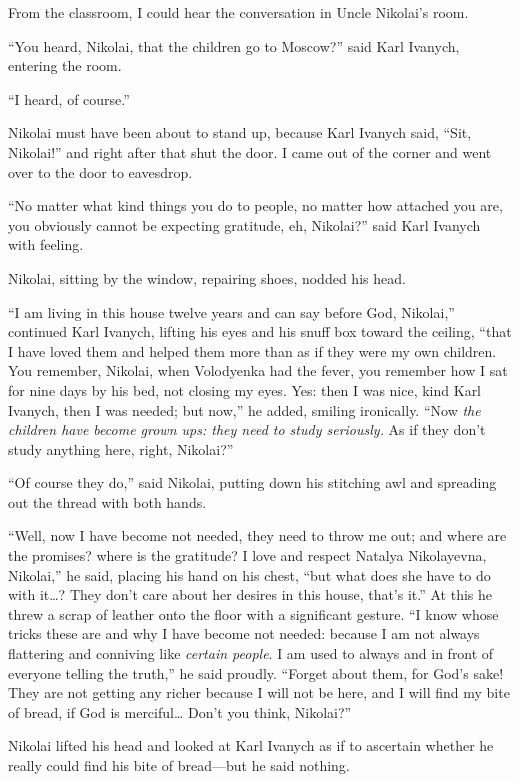 From the classroom, I could hear the conversation in Uncle Nikolai's room.

``You heard, Nikolai, that the children go to Moscow?'' said Karl Ivanych, entering the room. %

``I heard, of course.'' %

Nikolai must have been about to stand up, because Karl Ivanych said, ``Sit, Nikolai!'' and right after that shut the door. I came out of the corner and went over to the door to eavesdrop.

``No matter what kind things you do to people, no matter how attached you are, you obviously cannot be expecting gratitude, eh, Nikolai?'' said Karl Ivanych with feeling. %

Nikolai, sitting by the window, repairing shoes, nodded his head.

``I am living in this house twelve years and can say before God, Nikolai,'' continued Karl Ivanych, lifting his eyes and his snuff box toward the ceiling, ``that I have loved them and helped them more than as if they were my own children. You remember, Nikolai, when Volodyenka had the fever, you remember how I sat for nine days by his bed, not closing my eyes. Yes: then I was nice, kind Karl Ivanych, then I was needed; but now,'' he added, smiling ironically. ``Now \emph{the children have become grown ups: they need to study seriously.} As if they don't study anything here, right, Nikolai?'' %

``Of course they do,'' said Nikolai, putting down his stitching awl and spreading out the thread with both hands. %

``Well, now I have become not needed, they need to throw me out; and where are the promises? where is the gratitude? I love and respect Natalya Nikolayevna, Nikolai,'' he said, placing his hand on his chest, ``but what does she have to do with it\ldots{}? They don't care about her desires in this house, that's it.'' At this he threw a scrap of leather onto the floor with a significant gesture. ``I know whose tricks these are and why I have become not needed: because I am not always flattering and conniving like \emph{certain people}. I am used to always and in front of everyone telling the truth,'' he said proudly. ``Forget about them, for God's sake! They are not getting any richer because I will not be here, and I will find my bite of bread, if God is merciful\ldots{} Don't you think, Nikolai?'' %

Nikolai lifted his head and looked at Karl Ivanych as if to ascertain whether he really could find his bite of bread---but he said nothing.

